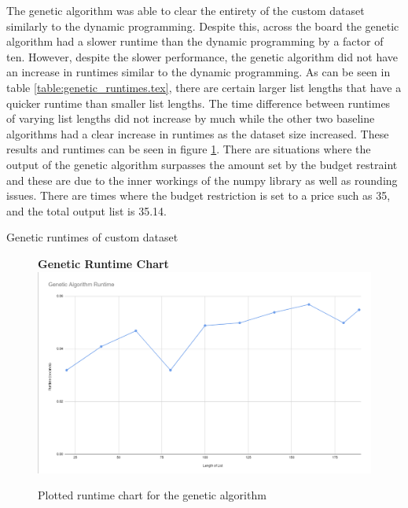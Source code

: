 \documentclass[10pt,journal,compsoc]{IEEEtran}
\begin{document}
The genetic algorithm was able to clear the entirety of the custom dataset
similarly to the dynamic programming. Despite this, across the board the genetic
algorithm had a slower runtime than the dynamic programming by a factor of ten.
However, despite the slower performance, the genetic algorithm did not have an
increase in runtimes similar to the dynamic programming. As can be seen in table
\ref{table:genetic_runtimes.tex}, there are certain larger list lengths that
have a quicker runtime than smaller list lengths. The time difference between
runtimes of varying list lengths did not increase by much while the other two
baseline algorithms had a clear increase in runtimes as the dataset size
increased. These results and runtimes can be seen in figure
\ref{fig:genetic_timecomplexity.png}. There are situations where the output of
the genetic algorithm surpasses the amount set by the budget restraint and these
are due to the inner workings of the numpy library as well as rounding issues.
There are times where the budget restriction is set to a price such as 35, and
the total output list is 35.14. 

\begin{table}[h]
    \setlength\tabcolsep{2pt}
    \centering
    
    \caption{Genetic runtimes of custom dataset}
    \label{table:genetic_runtimes.tex}
\end{table}

\begin{figure}[h]
    \centering
    \textbf{Genetic Runtime Chart}
    \includegraphics[width=\columnwidth]{assets/genetic_runtime.png}
    \caption{Plotted runtime chart for the genetic algorithm}
    \label{fig:genetic_timecomplexity.png}
\end{figure}
\end{document}
